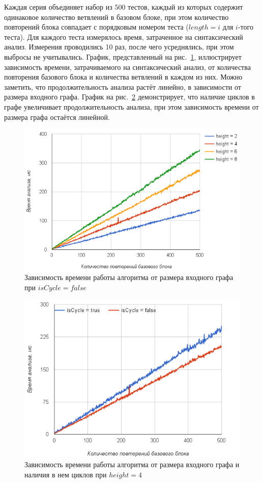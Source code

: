 Каждая серия объединяет набор из $500$ тестов, каждый из которых содержит одинаковое количество ветвлений в базовом блоке, при этом количество повторений блока совпадает с порядковым номером теста ($length=i$ для $i$-того теста). Для каждого теста измерялось время, затраченное на синтаксический анализ. Измерения проводились 10 раз, после чего усреднялись, при этом выбросы не учитывались. График, представленный на рис.~\ref{diffheights}, иллюстрирует зависимость времени, затрачиваемого на синтаксический анализ, от количества повторения базового блока и количества ветвлений в каждом из них. Можно заметить, что продолжительность анализа растёт линейно, в зависимости от размера входного графа. График на рис.~\ref{CycleVsLinear} демонстрирует, что наличие циклов в графе увеличивает продолжительность анализа, при этом зависимость времени от размера графа остаётся линейной. 
\begin{figure}[h!]
 \centering
 \includegraphics[width=\textwidth]{Verbitskaya/pics/diffheights.png}
 \caption{Зависимость времени работы алгоритма от размера входного графа при $isCycle=false$}
 \label{diffheights}
\end{figure}
\begin{figure}[h!]
 \centering
 \includegraphics[width=\textwidth]{Verbitskaya/pics/heigh4.png}
 \caption{Зависимость времени работы алгоритма от размера входного графа и наличия в нем циклов при $height=4$}
 \label{CycleVsLinear}
\end{figure}

